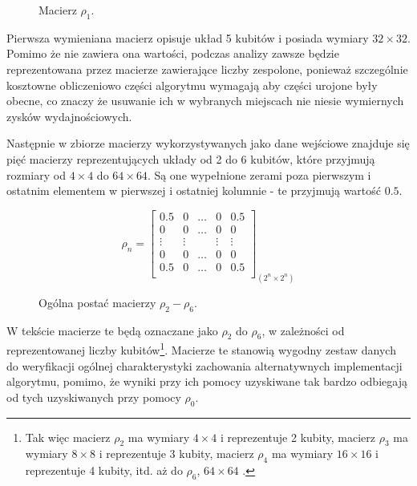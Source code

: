 \documentclass[11pt, a4paper]{article}
\begin{document}
\begin{sloppypar}
    \FloatBarrier
    \begin{figure}[ht]
      \centering
      \setcounter{MaxMatrixCols}{33}
      
      \caption{Macierz $\rho_{1}$.}
      \label{rho-1}
    \end{figure}

    \FloatBarrier

    Pierwsza wymieniana macierz opisuje układ 5 kubitów i posiada wymiary $32\times32$.
    Pomimo że nie zawiera ona wartości, podczas analizy zawsze będzie reprezentowana przez
    macierze zawierające liczby zespolone, ponieważ szczególnie kosztowne obliczeniowo
    części algorytmu wymagają aby części urojone były obecne, co znaczy że usuwanie ich w
    wybranych miejscach nie niesie wymiernych zysków wydajnościowych.

    Następnie w zbiorze macierzy wykorzystywanych jako dane wejściowe znajduje się pięć macierzy
    reprezentujących układy od 2 do 6 kubitów, które przyjmują rozmiary od $4\times 4$
    do $64\times64$. Są one wypełnione zerami poza pierwszym i ostatnim elementem w pierwszej
    i ostatniej kolumnie - te przyjmują wartość $0.5$.

    \FloatBarrier
    \begin{figure}[ht]
      \centering
      \setcounter{MaxMatrixCols}{33}
      \[
        \rho_{n}=
        \begin{bmatrix}
          0.5    & 0      & \hdots & 0      & 0.5    \\
          0      & 0      & \hdots & 0      & 0      \\
          \vdots & \vdots &        & \vdots & \vdots \\
          0      & 0      & \hdots & 0      & 0      \\
          0.5    & 0      & \hdots & 0      & 0.5    \\
        \end{bmatrix}_{(2^{n}\times2^{n})}
      \]
      \caption{Ogólna postać macierzy $\rho_{2}- \rho_{6}$.}
      \label{rho-2-6}
    \end{figure}

    \FloatBarrier

    W tekście macierze te będą oznaczane jako $\rho_{2}$ do $\rho_{6}$, w zależności od
    reprezentowanej liczby kubitów\footnote{Tak więc macierz $\rho_{2}$ ma wymiary $4\times
    4$ i reprezentuje 2 kubity, macierz $\rho_{3}$ ma wymiary $8\times8$ i reprezentuje
    3 kubity, macierz $\rho_{4}$ ma wymiary $16\times16$ i reprezentuje 4 kubity, itd. aż
    do $\rho_{6}$, $64\times64$ .}. Macierze te stanowią wygodny zestaw danych do
    weryfikacji ogólnej charakterystyki zachowania alternatywnych implementacji
    algorytmu, pomimo, że wyniki przy ich pomocy uzyskiwane tak bardzo odbiegają od tych
    uzyskiwanych przy pomocy $\rho_{0}$.


\end{sloppypar}
\end{document}
